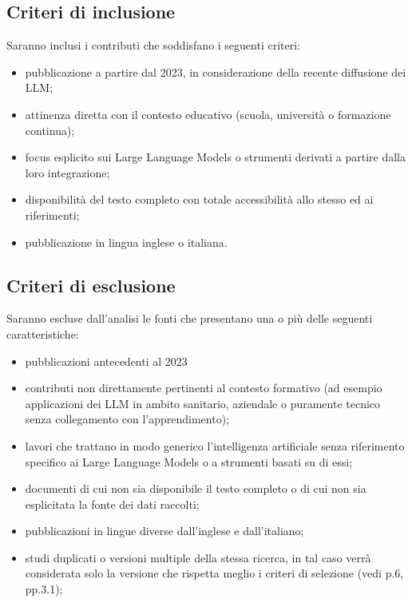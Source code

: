 \documentclass[a4paper,9pt]{article}
\begin{document}
	
	\subsection{Criteri di inclusione}
	
	Saranno inclusi i contributi che soddisfano i seguenti criteri:
	\begin{itemize}
		\item pubblicazione a partire dal 2023, in considerazione della recente diffusione dei LLM;
		\item attinenza diretta con il contesto educativo (scuola, università o formazione continua);
		\item focus esplicito sui Large Language Models o strumenti derivati a partire dalla loro integrazione;
		\item disponibilità del testo completo con totale accessibilità allo stesso ed ai riferimenti;
		\item pubblicazione in lingua inglese o italiana.
	\end{itemize}
	
	\subsection{Criteri di esclusione}
	
	Saranno escluse dall’analisi le fonti che presentano una o più delle seguenti caratteristiche:
	\begin{itemize}
		\item pubblicazioni antecedenti al 2023 
		\item contributi non direttamente pertinenti al contesto formativo (ad esempio applicazioni dei LLM in ambito sanitario, aziendale o puramente tecnico senza collegamento con l’apprendimento);
		\item lavori che trattano in modo generico l’intelligenza artificiale senza riferimento specifico ai Large Language Models o a strumenti basati su di essi;
		\item documenti di cui non sia disponibile il testo completo o di cui non sia esplicitata la fonte dei dati raccolti;
		\item pubblicazioni in lingue diverse dall’inglese e dall’italiano;
		\item studi duplicati o versioni multiple della stessa ricerca, in tal caso verrà considerata solo la versione che rispetta meglio i criteri di selezione (vedi p.6, pp.3.1);

	\end{itemize}
	
\end{document}
